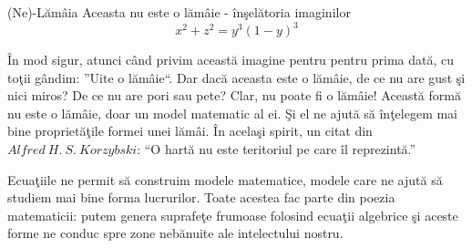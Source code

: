 \begin{surferPage}{(Ne)-L\u am\^aia}
Aceasta nu este o l\u am\^aie - \^in\c sel\u atoria imaginilor\\
\smallskip
\[x^2 + z^2 = y^3 (1 - y)^3\]


\singlespacing
\^In mod sigur, atunci c\^and privim aceast\u a imagine pentru pentru prima dat\u a, cu to\c tii g\^andim:
''Uite o l\u am\^aie``. Dar dac\u a aceasta este o l\u am\^aie, de ce nu are gust \c si nici miros? De ce nu are
pori sau pete? Clar, nu poate fi o l\u am\^aie!
\singlespacing
Aceast\u a form\u a nu este o l\u am\^aie, doar un model matematic al ei. \c Si el
ne ajut\u a s\u a \^in\c telegem mai bine propriet\u a\c tile formei unei l\u am\^ai.
\^In acela\c si spirit, un citat din $Alfred\ H.\ S.\ Korzybski$: ``O hart\u a nu este teritoriul pe care \^il
reprezint\u a.''\\
\singlespacing


Ecua\c tiile ne permit s\u a construim modele matematice, modele care ne ajut\u a s\u a studiem mai bine forma lucrurilor.
\singlespacing
Toate acestea fac parte din poezia matematicii: putem genera suprafe\c te frumoase folosind ecua\c tii algebrice
\c si aceste forme ne conduc spre zone neb\u anuite ale intelectului nostru.
\end{surferPage}
